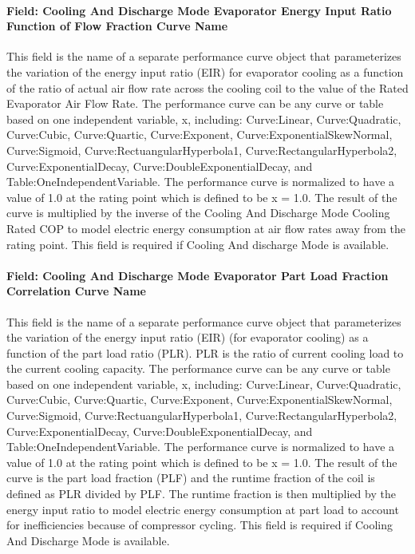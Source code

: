 \paragraph{Field: Cooling And Discharge Mode Evaporator Energy Input Ratio Function of Flow Fraction Curve Name}\label{field-cooling-and-discharge-mode-evaporator-energy-input-ratio-function-of-flow-fraction-curve-name}

This field is the name of a separate performance curve object that parameterizes the variation of the energy input ratio (EIR) for evaporator cooling as a function of the ratio of actual air flow rate across the cooling coil to the value of the Rated Evaporator Air Flow Rate. The performance curve can be any curve or table based on one independent variable, x, including: Curve:Linear, Curve:Quadratic, Curve:Cubic, Curve:Quartic, Curve:Exponent, Curve:ExponentialSkewNormal, Curve:Sigmoid, Curve:RectuangularHyperbola1, Curve:RectangularHyperbola2, Curve:ExponentialDecay, Curve:DoubleExponentialDecay, and Table:OneIndependentVariable. The performance curve is normalized to have a value of 1.0 at the rating point which is defined to be x = 1.0. The result of the curve is multiplied by the inverse of the Cooling And Discharge Mode Cooling Rated COP to model electric energy consumption at air flow rates away from the rating point. This field is required if Cooling And discharge Mode is available.

\paragraph{Field: Cooling And Discharge Mode Evaporator Part Load Fraction Correlation Curve Name}\label{field-cooling-and-discharge-mode-evaporator-part-load-fraction-correlation-curve-name}

This field is the name of a separate performance curve object that parameterizes the variation of the energy input ratio (EIR) (for evaporator cooling) as a function of the part load ratio (PLR). PLR is the ratio of current cooling load to the current cooling capacity. The performance curve can be any curve or table based on one independent variable, x, including: Curve:Linear, Curve:Quadratic, Curve:Cubic, Curve:Quartic, Curve:Exponent, Curve:ExponentialSkewNormal, Curve:Sigmoid, Curve:RectuangularHyperbola1, Curve:RectangularHyperbola2, Curve:ExponentialDecay, Curve:DoubleExponentialDecay, and Table:OneIndependentVariable. The performance curve is normalized to have a value of 1.0 at the rating point which is defined to be x = 1.0. The result of the curve is the part load fraction (PLF) and the runtime fraction of the coil is defined as PLR divided by PLF. The runtime fraction is then multiplied by the energy input ratio to model electric energy consumption at part load to account for inefficiencies because of compressor cycling. This field is required if Cooling And Discharge Mode is available.

